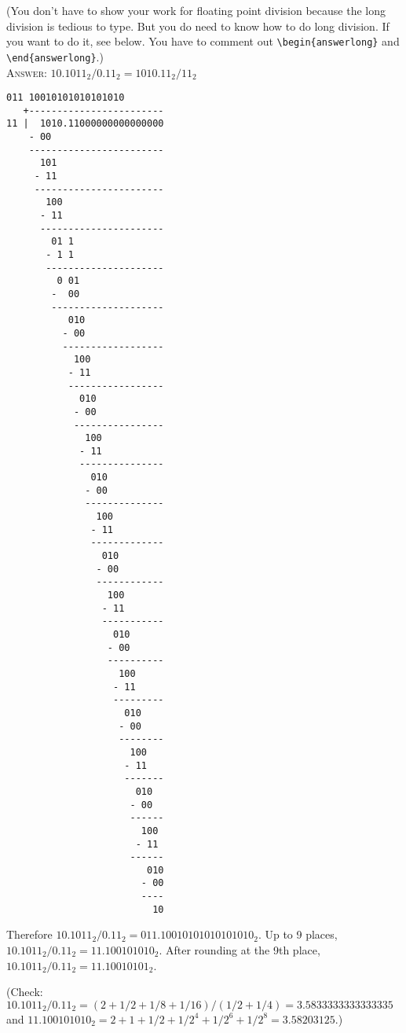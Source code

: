 (You don't have to show your work for floating point division because
the long division is tedious to type.
But you do need to know how to do long division. 
If you want to do it, see below. You have to comment out
\verb!\begin{answerlong}! and \verb!\end{answerlong}!.)
\\
\textsc{Answer:}\vspace{-2mm}
  $10.1011_{2} / 0.11_{2} = 1010.11_{2} / 11_{2}$
\begin{Verbatim}[fontsize=\tiny]
       011 10010101010101010 
   +------------------------
11 |  1010.11000000000000000
    - 00
    ------------------------
      101
     - 11
     -----------------------
       100
      - 11
      ----------------------
        01 1
       - 1 1
       --------------------- 
         0 01
        -  00
        --------------------
           010 
          - 00
          ------------------
            100
           - 11
           -----------------
             010
            - 00
            ----------------
              100
             - 11
             ---------------
               010
              - 00
              -------------- 
                100
               - 11
               ------------- 
                 010
                - 00
                ------------
                  100
                 - 11
                 ----------- 
                   010
                  - 00
                  ---------- 
                    100
                   - 11
                   ---------
                     010
                    - 00
                    --------
                      100
                     - 11
                     -------
                       010
                      - 00
                      ------  
                        100
                       - 11
                      ------
                         010
                        - 00
                        ----
                          10
\end{Verbatim}

Therefore $10.1011_{2} / 0.11_{2} = 011.10010101010101010_2$.
Up to 9 places, $10.1011_{2} / 0.11_{2} = 11.100101010_2$.
After rounding at the 9th place, $10.1011_{2} / 0.11_{2} = 11.10010101_2$.

(Check:
$10.1011_{2} / 0.11_{2} = (2 + 1/2 + 1/8 + 1/16) / (1/2 + 1/4) = 3.5833333333333335$
and
$11.100101010_2 = 2 + 1 + 1/2 + 1/2^4 + 1/2^6 + 1/2^8 = 3.58203125$.)
